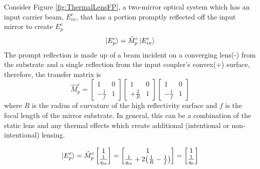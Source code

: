 		Consider Figure \ref{fig:ThermalLensFP}, a two-mirror optical system which has an input carrier beam, $E^c_{in}$, that has a portion promptly reflected off the input mirror to create $E^c_{p}$
		\begin{equation}
		\ket{E^{c}_{p}} = \hat{M}^{c}_{p} \ket{E^{c}_{in}}
		\end{equation}
		The prompt reflection is made up of a beam incident on a converging lens(-) from the substrate and a single reflection from the input coupler's convex(+) surface, therefore, the transfer matrix is
		\begin{equation}
		\hat{M}^{c}_{p} = 
		\begin{bmatrix}
						1 	&	0 
		\\ 	-\frac{1}{f} 	&	1
		\end{bmatrix}
		\begin{bmatrix}
						1 	&	0 
		\\ 	+\frac{2}{R} 	&	1
		\end{bmatrix}
		\begin{bmatrix}
						1 	&	0 
		\\ 	-\frac{1}{f} 	&	1
		\end{bmatrix}
		\end{equation}
		where $R$ is the radius of curvature of the high reflectivity surface and $f$ is the focal length of the mirror substrate. In general, this can be a combination of the static lens and any thermal effects which create additional (intentional or non-intentional) lensing.
		
		\begin{equation}\label{eq:promptE}
		 \ket{E^{c}_{p}}=
		 \hat{M}^{c}_{p}
		 \begin{bmatrix}
		 					1  
		 \\ 	\frac{1}{q_{\text{in}}}
		 \end{bmatrix}
		 =
		 \begin{bmatrix}
		 1  
		 \\ 	\frac{1}{q_{\text{in}}} + 2 \big(\frac{1}{R} - \frac{1}{f}\big)
		 \end{bmatrix}
		 =
		 \begin{bmatrix}
		 1  
		 \\ 	\frac{1}{q_{\text{p}}}
		 \end{bmatrix}
		\end{equation}
		
